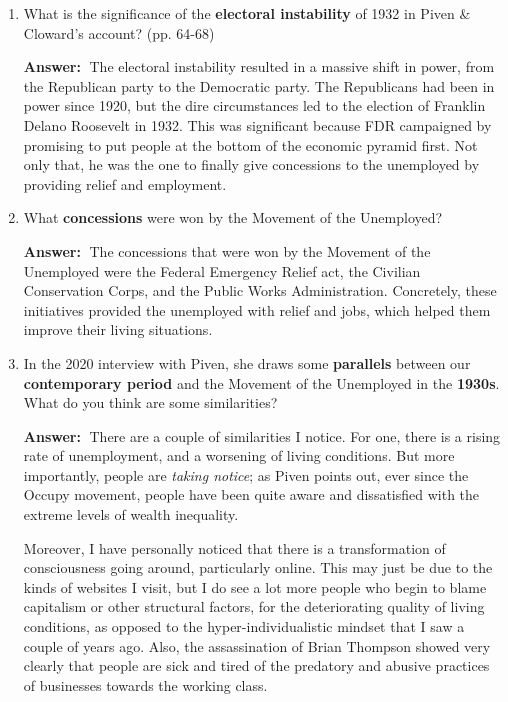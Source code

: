 \documentclass{article}
\newcommand{\answer}{\textbf{Answer:}$\;$}
\begin{document}
\begin{enumerate}[label=\arabic*)]
\begin{enumerate}
    \end{enumerate}
    
    \item What is the significance of the \textbf{electoral instability} of 1932 in Piven \& Cloward's account? (pp. 64-68)

    \answer
    The electoral instability resulted in a massive shift in power, from the Republican party to the Democratic party.
    The Republicans had been in power since 1920, but the dire circumstances led to the election of Franklin Delano Roosevelt in 1932.
    This was significant because FDR campaigned by promising to put people at the bottom of the economic pyramid first.
    Not only that, he was the one to finally give concessions to the unemployed by providing relief and employment.

    \item What \textbf{concessions} were won by the Movement of the Unemployed?

    \answer
    The concessions that were won by the Movement of the Unemployed were the Federal Emergency Relief act, the Civilian Conservation Corps, and the Public Works Administration.
    Concretely, these initiatives provided the unemployed with relief and jobs, which helped them improve their living situations.    

    \item In the 2020 interview with Piven, she draws some \textbf{parallels} between our \textbf{contemporary period} and the Movement of the Unemployed in the \textbf{1930s}.
    What do you think are some similarities?

    \answer
    There are a couple of similarities I notice.
    For one, there is a rising rate of unemployment, and a worsening of living conditions.
    But more importantly, people are \textit{taking notice};
    as Piven points out, ever since the Occupy movement, people have been quite aware and dissatisfied with the extreme levels of wealth inequality.
    
    Moreover, I have personally noticed that there is a transformation of consciousness going around, particularly online.
    This may just be due to the kinds of websites I visit, but I do see a lot more people who begin to blame capitalism or other structural factors, for the deteriorating quality of living conditions, as opposed to the hyper-individualistic mindset that I saw a couple of years ago.
    Also, the assassination of Brian Thompson showed very clearly that people are sick and tired of the predatory and abusive practices of businesses towards the working class.
    
\end{enumerate}
 
\end{document}
